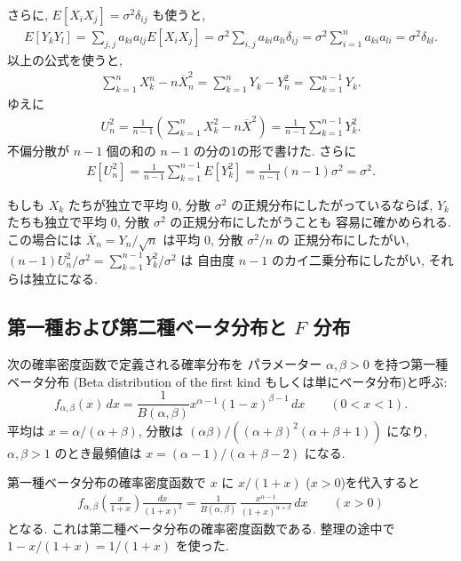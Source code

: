 \documentclass[12pt,twoside]{jarticle}
\newcommand\Xbar{{\overline X}}
\theoremstyle{jplain}
\theoremstyle{jplain}
\theoremstyle{jplain}
\numberwithin{theorem}{section}
\numberwithin{equation}{section}
\numberwithin{figure}{section}
\numberwithin{table}{section}
\begin{document}
さらに, $E[X_i X_j]=\sigma^2\delta_{ij}$ も使うと,
\begin{align*}
E[Y_k Y_l]
=\sum_{j,j} a_{ki}a_{lj}E[X_i X_j]
=\sigma^2 \sum_{i,j} a_{ki}a_{li}\delta_{ij}
=\sigma^2 \sum_{i=1}^n a_{ki}a_{li}
=\sigma^2 \delta_{kl}.
\end{align*}
以上の公式を使うと,
\begin{align*}
\sum_{k=1}^n X_k^n - n\Xbar_n^2
= \sum_{k=1}^n Y_k - Y_n^2
= \sum_{k=1}^{n-1} Y_k.
\end{align*}
ゆえに
\begin{align*}
U_n^2
=\frac{1}{n-1}\left(\sum_{k=1}^n X_k^2 - n\Xbar^2\right)
=\frac{1}{n-1}\sum_{k=1}^{n-1}Y_k^2.
\end{align*}
不偏分散が $n-1$ 個の和の $n-1$ の分の1の形で書けた.
さらに
\begin{align*}
E[U_n^2] = \frac{1}{n-1}\sum_{k=1}^{n-1}E[Y_k^2]
=\frac{1}{n-1}(n-1)\sigma^2=\sigma^2.
\end{align*}

もしも $X_k$ たちが独立で平均 $0$, 分散 $\sigma^2$ の正規分布にしたがっているならば,
$Y_k$ たちも独立で平均 $0$, 分散 $\sigma^2$ の正規分布にしたがうことも
容易に確かめられる. この場合には $\Xbar_n=Y_n/\sqrt{n}$ は平均 $0$, 分散 $\sigma^2/n$ の
正規分布にしたがい, $(n-1)U_n^2/\sigma^2=\sum_{k=1}^{n-1}Y_k^2/\sigma^2$ は
自由度 $n-1$ のカイ二乗分布にしたがい, それらは独立になる.




\subsection{第一種および第二種ベータ分布と $F$ 分布}
\label{sec:Beta1st}

次の確率密度函数で定義される確率分布を
パラメーター $\alpha,\beta>0$ を持つ第一種ベータ分布
(Beta distribution of the first kind もしくは単にベータ分布)と呼ぶ:
\[
f_{\alpha,\beta}(x)\,dx
=\frac{1}{B(\alpha,\beta)} x^{\alpha-1}(1-x)^{\beta-1}\,dx
\qquad (0<x<1).
\]
平均は $x=\alpha/(\alpha+\beta)$,
分散は $(\alpha\beta)/((\alpha+\beta)^2(\alpha+\beta+1))$ になり,
$\alpha,\beta>1$ のとき最頻値は $x=(\alpha-1)/(\alpha+\beta-2)$ になる.

第一種ベータ分布の確率密度函数で $x$ に $x/(1+x)$ ($x>0$)を代入すると
\begin{align*}
f_{\alpha,\beta}\left(\frac{x}{1+x}\right)\frac{dx}{(1+x)^2}
=
\frac{1}{B(\alpha,\beta)}\,
\frac{x^{\alpha-1}}{(1+x)^{\alpha+\beta}}\,dx
\qquad (x>0)
\end{align*}
となる. これは第二種ベータ分布の確率密度函数である.
整理の途中で $1-x/(1+x)=1/(1+x)$ を使った.
\end{document}
